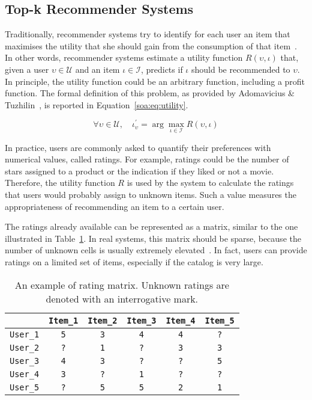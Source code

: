 \subsection{Top-k Recommender Systems}
\label{soa:sec:topk}

Traditionally, recommender systems try to identify for each user an item that maximises the utility that she should gain from the consumption of that item~\cite{Bobadilla2013}. In other words, recommender systems estimate a utility function $R(\upsilon, \iota)$ that, given a user $\upsilon \in \mathcal{U}$ and an item $\iota \in \mathcal{I}$, predicts if $\iota$ should be recommended to $\upsilon$. In principle, the utility function could be an arbitrary function, including a profit function. The formal definition of this problem, as provided by Adomavicius \& Tuzhilin~\cite{Adomavicius2015}, is reported in Equation~\ref{soa:eq:utility}.

\begin{equation}
\forall \upsilon \in \mathcal{U}, \quad \iota^{\prime}_{\upsilon} = \arg \max \limits_{\iota \in \mathcal{I}} R(\upsilon, \iota)
\label{soa:eq:utility}
\end{equation}

In practice, users are commonly asked to quantify their preferences with numerical values, called ratings. For example, ratings could be the number of stars assigned to a product or the indication if they liked or not a movie. Therefore, the utility function $R$ is used by the system to calculate the ratings that users would probably assign to unknown items. Such a value measures the appropriateness of recommending an item to a certain user.

The ratings already available can be represented as a matrix, similar to the one illustrated in Table~\ref{soa:tab:ratings}. In real systems, this matrix should be sparse, because the number of unknown cells is usually extremely elevated~\cite{Ricci2015}. In fact, users can provide ratings on a limited set of items, especially if the catalog is very large.

\begin{table}
\centering
\begin{tabular}{@{}lccccc@{}}
\toprule
& \texttt{Item\_1} & \texttt{Item\_2} & \texttt{Item\_3} & \texttt{Item\_4} & \texttt{Item\_5} \\ \midrule
\texttt{User\_1} & \texttt{5} & \texttt{3} & \texttt{4} & \texttt{4} & \texttt{?} \\
\texttt{User\_2} & \texttt{?} & \texttt{1} & \texttt{?} & \texttt{3} & \texttt{3} \\
\texttt{User\_3} & \texttt{4} & \texttt{3} & \texttt{?} & \texttt{?} & \texttt{5} \\
\texttt{User\_4} & \texttt{3} & \texttt{?} & \texttt{1} & \texttt{?} & \texttt{?} \\
\texttt{User\_5} & \texttt{?} & \texttt{5} & \texttt{5} & \texttt{2} & \texttt{1} \\ \bottomrule
\end{tabular}
\caption[Example of rating matrix]{An example of rating matrix. Unknown ratings are denoted with an interrogative mark.}
\label{soa:tab:ratings}
\end{table}

